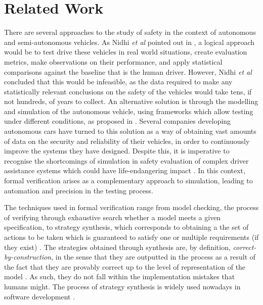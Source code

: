 \section{Related Work}

There are several approaches to the study of safety in the context of autonomous and semi-autonomous vehicles. As Nidhi \textit{et al} pointed out in \cite{driving-to-safety}, a logical approach would be to test drive these vehicles in real world situations, create evaluation metrics, make observations on their performance, and apply statistical comparisons against the baseline that is the human driver. However, Nidhi \textit{et al} concluded that this would be infeasible, as the data required to make any statistically relevant conclusions on the safety of the vehicles would take tens, if not hundreds, of years to collect. An alternative solution is through the modelling and simulation of the autonomous vehicle, using frameworks which allow testing under different conditions, as proposed in \cite{sim1, sim2, sim3, sim4}. Several companies developing autonomous cars have turned to this solution as a way of obtaining vast amounts of data on the security and reliability of their vehicles, in order to continuously improve the systems they have designed. Despite this, it is imperative to recognise the shortcomings of simulation in safety evaluation of complex driver assistance systems which could have life-endangering impact \cite{challenges1, challenges2}. In this context, formal verification arises as a complementary approach to simulation, leading to automation and precision in the testing process.

The techniques used in formal verification range from model checking, the process of verifying through exhaustive search whether a model meets a given specification, to strategy synthesis, which corresponds to obtaining a the set of actions to be taken which is guaranteed to satisfy one or multiple requirements (if they exist) \cite{bk08, games2}. The strategies obtained through synthesis are, by definition, \textit{correct-by-construction}, in the sense that they are outputted in the process as a result of the fact that they are provably correct up to the level of representation of the model \cite{bk08, games2}. As such, they do not fall within the implementation mistakes that humans might. The process of strategy synthesis is widely used nowadays in software development \cite{software_1, software_2, software_3}. 


